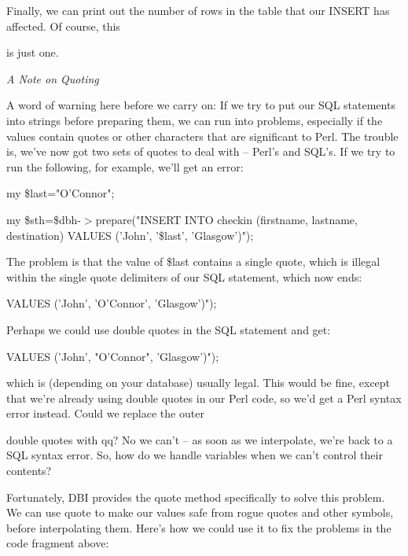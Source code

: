 \documentclass[a4paper,11pt]{book}
\begin{document}
\noindent 

\noindent 

\noindent Finally, we can print out the number of rows in the table that our INSERT has affected. Of course, this

\noindent is just one.

\noindent 

\noindent \textit{A Note on Quoting}

\noindent A word of warning here before we carry on: If we try to put our SQL statements into strings before preparing them, we can run into problems, especially if the values contain quotes or other characters that are significant to Perl. The trouble is, we've now got two sets of quotes to deal with -- Perl's and SQL's. If we try to run the following, for example, we'll get an error:

\noindent 

\noindent my \$last="O'Connor";

\noindent my \$sth=\$dbh-$>$prepare("INSERT INTO checkin (firstname, lastname, destination) VALUES ('John', '\$last', 'Glasgow')");

\noindent 

\noindent The problem is that the value of \$last contains a single quote, which is illegal within the single quote delimiters of our SQL statement, which now ends:

\noindent 

\noindent VALUES ('John', 'O'Connor', 'Glasgow')");

\noindent 

\noindent Perhaps we could use double quotes in the SQL statement and get:

\noindent 

\noindent VALUES ('John', "O'Connor", 'Glasgow')");

\noindent 

\noindent which is (depending on your database) usually legal. This would be fine, except that we're already using double quotes in our Perl code, so we'd get a Perl syntax error instead. Could we replace the outer

\noindent double quotes with qq? No we can't -- as soon as we interpolate, we're back to a SQL syntax error. So, how do we handle variables when we can't control their contents?

\noindent 

\noindent Fortunately, DBI provides the quote method specifically to solve this problem. We can use quote to make our values safe from rogue quotes and other symbols, before interpolating them. Here's how we could use it to fix the problems in the code fragment above:
\end{document}
